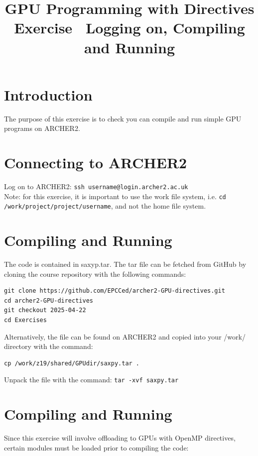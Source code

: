 \documentclass{article}
\begin{document}
\title{GPU Programming with Directives Exercise \
  Logging on, Compiling and Running}

\maketitle

\section{Introduction}


The purpose of this exercise is to check you can compile and run
simple GPU programs on ARCHER2.

\section{Connecting to ARCHER2}

Log on to ARCHER2: \verb+ssh username@login.archer2.ac.uk+ \\

Note: for this exercise, it is important to use the work file system,
i.e. \verb+cd /work/project/project/username+, and not the home file system.

\section{Compiling and Running}
The code is contained in saxyp.tar. The tar file can be fetched from GitHub by
cloning the course repository with the following commands:

\begin{verbatim}
git clone https://github.com/EPCCed/archer2-GPU-directives.git
cd archer2-GPU-directives
git checkout 2025-04-22
cd Exercises
\end{verbatim}

Alternatively, the file can be found on ARCHER2 and copied into your
/work/ directory with the command:

\begin{verbatim}
cp /work/z19/shared/GPUdir/saxpy.tar .
\end{verbatim}

Unpack the file with the command: \verb+tar -xvf saxpy.tar+

\section{Compiling and Running}

Since this exercise will involve offloading to GPUs with OpenMP
directives, certain modules must be loaded prior to compiling the
code:
\end{document}
